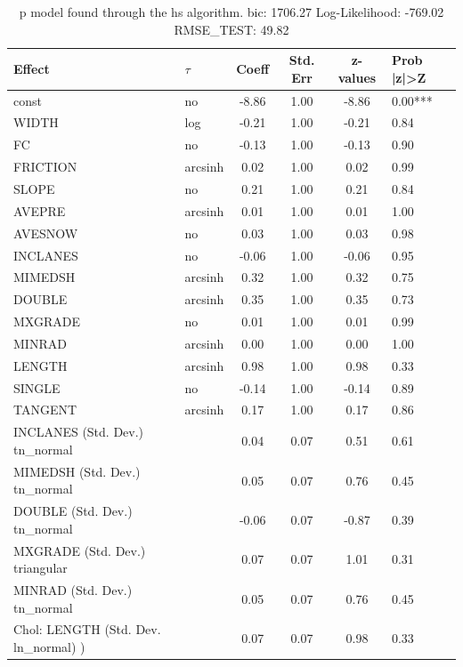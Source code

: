 \begin{table}
	\caption{p model found through the hs algorithm. bic: 1706.27 Log-Likelihood: -769.02 RMSE_TEST: 49.82}
	\begin{center}
		\begin{tabular}{|l|l|c|c|c|l|}
			\hline
			Effect & $\tau$ & Coeff & Std. Err & z-values & Prob |z|>Z \\
			\hline
			const & no & -8.86 & 1.00 & -8.86 & 0.00*** \\
			\hline
			WIDTH & log & -0.21 & 1.00 & -0.21 & 0.84 \\
			\hline
			FC & no & -0.13 & 1.00 & -0.13 & 0.90 \\
			\hline
			FRICTION & arcsinh & 0.02 & 1.00 & 0.02 & 0.99 \\
			\hline
			SLOPE & no & 0.21 & 1.00 & 0.21 & 0.84 \\
			\hline
			AVEPRE & arcsinh & 0.01 & 1.00 & 0.01 & 1.00 \\
			\hline
			AVESNOW & no & 0.03 & 1.00 & 0.03 & 0.98 \\
			\hline
			INCLANES & no & -0.06 & 1.00 & -0.06 & 0.95 \\
			\hline
			MIMEDSH & arcsinh & 0.32 & 1.00 & 0.32 & 0.75 \\
			\hline
			DOUBLE & arcsinh & 0.35 & 1.00 & 0.35 & 0.73 \\
			\hline
			MXGRADE & no & 0.01 & 1.00 & 0.01 & 0.99 \\
			\hline
			MINRAD & arcsinh & 0.00 & 1.00 & 0.00 & 1.00 \\
			\hline
			LENGTH & arcsinh & 0.98 & 1.00 & 0.98 & 0.33 \\
			\hline
			SINGLE & no & -0.14 & 1.00 & -0.14 & 0.89 \\
			\hline
			TANGENT & arcsinh & 0.17 & 1.00 & 0.17 & 0.86 \\
			\hline
			INCLANES (Std. Dev.) tn_normal &  & 0.04 & 0.07 & 0.51 & 0.61 \\
			\hline
			MIMEDSH (Std. Dev.) tn_normal &  & 0.05 & 0.07 & 0.76 & 0.45 \\
			\hline
			DOUBLE (Std. Dev.) tn_normal &  & -0.06 & 0.07 & -0.87 & 0.39 \\
			\hline
			MXGRADE (Std. Dev.) triangular &  & 0.07 & 0.07 & 1.01 & 0.31 \\
			\hline
			MINRAD (Std. Dev.) tn_normal &  & 0.05 & 0.07 & 0.76 & 0.45 \\
			\hline
			 Chol: LENGTH (Std. Dev. ln_normal) ) &  & 0.07 & 0.07 & 0.98 & 0.33 \\

\end{tabular}
\end{center}
\end{table}
